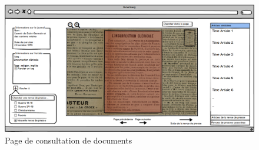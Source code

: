 \bigskip

    \begin{figure}[H]
        \centering
        \includegraphics[width=\textwidth]{figures/consultation.png}
            \caption{Page de consultation de documents}
            \label{fig:consultation}
    \end{figure}